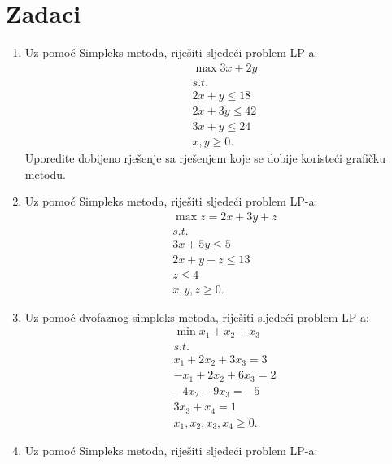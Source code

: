 \documentclass[a4paper, utf8, 11pt, colorlinks]{book}
\begin{document}
\section{Zadaci}
\begin{enumerate}
 \item Uz pomoć Simpleks metoda, riješiti sljedeći problem LP-a:%
 \begin{align*}
 	 &\max  3x + 2y \\
 	 & s.t. \\
 	 & 2x + y \leq 18 \\
 	 & 2x + 3y \leq 42 \\
 	 & 3x + y \leq 24 \\
 	 & x,y \geq 0.
 \end{align*} 
Uporedite dobijeno rješenje sa rješenjem koje se dobije 
koristeći grafičku metodu.
\item %
   Uz pomoć Simpleks metoda, riješiti sljedeći problem LP-a:
 \begin{align*}
 	  &\max z = 2x + 3y + z \\
 	  & s.t. \\
 	  & 3x + 5 y \leq 5 \\
 	  & 2x + y - z \leq 13 \\
 	  & z \leq 4 \\
 	  & x,y,z \geq 0.
 \end{align*}
\item Uz pomoć dvofaznog simpleks metoda, riješiti sljedeći problem LP-a:%
   \begin{align*}
   	    &\min  x_1 + x_2 + x_3 \\
   	    & s.t. \\
   	    & x_1 + 2 x_2 + 3 x_3 = 3 \\
   	    & -x_1 + 2 x_2 + 6 x_3 = 2 \\
   	    & - 4x_2 - 9 x_3 = -5 \\
   	    & 3 x_3 + x_4 = 1 \\
   	    & x_1, x_2, x_3, x_4 \geq 0.
   \end{align*}
\item  Uz pomoć Simpleks metoda, riješiti sljedeći problem LP-a:%
\begin{align*}

\end{align*}
\end{enumerate}
\end{document}
